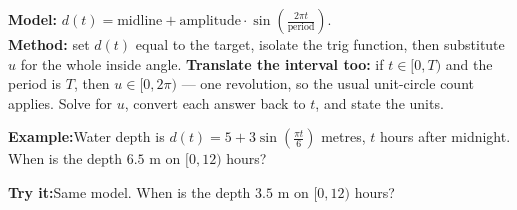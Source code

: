 \documentclass[12pt]{article}
\begin{document}
\begin{formulabox}
\textbf{Model:} $d(t) = \text{midline} + \text{amplitude}\cdot
\sin\!\left(\frac{2\pi t}{\text{period}}\right)$.\\[2pt]
\textbf{Method:} set $d(t)$ equal to the target, isolate the trig function, then
substitute $u$ for the whole inside angle. \textbf{Translate the interval too:}
if $t \in [0, T)$ and the period is $T$, then $u \in [0, 2\pi)$ --- one
revolution, so the usual unit-circle count applies. Solve for $u$, convert each
answer back to $t$, and state the units.
\end{formulabox}

\begin{examplebox}
\textbf{Example:}\quad Water depth is $d(t) = 5 + 3\sin\!\left(\frac{\pi t}{6}\right)$
metres, $t$ hours after midnight. When is the depth $6.5$ m on $[0, 12)$ hours?
\step{$3\sin\!\left(\frac{\pi t}{6}\right) = 1.5 \;\Rightarrow\;
\sin u = \tfrac{1}{2}$ where $u = \frac{\pi t}{6} \in [0, 2\pi)$.}
\end{examplebox}

\begin{tryitbox}
\textbf{Try it:}\quad Same model. When is the depth $3.5$ m on $[0, 12)$ hours?\\[2pt]
\end{tryitbox}
\end{document}
